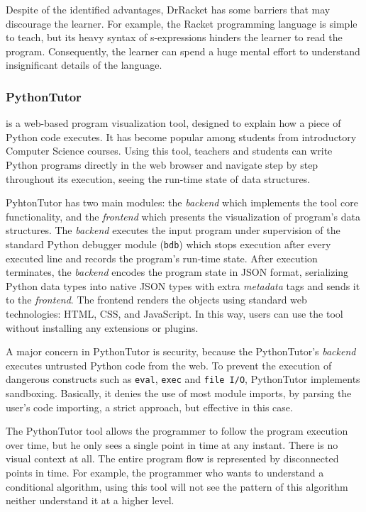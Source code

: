 Despite of the identified advantages, DrRacket has some barriers that may discourage the learner. For example, the Racket programming language is simple to teach, but its heavy syntax of s-expressions hinders the learner to read the program. Consequently, the learner can spend a huge mental effort to understand insignificant details of the language.
\subsubsection{PythonTutor~\cite{GuoSIGCSE2013}} is a web-based program visualization tool, designed to explain how a piece of Python code executes. It has become popular among students from introductory Computer Science courses. Using this tool, teachers and students can write Python programs directly in the web browser and navigate step by step throughout its execution, seeing the run-time state of data structures.

PyhtonTutor has two main modules: the \textit{backend} which implements the tool core functionality, and the \textit{frontend} which presents the visualization of program's data structures. The \textit{backend} executes the input program under supervision of the standard Python debugger module (\texttt{bdb}) which stops execution after every executed line and records the program's run-time state. After execution terminates, the \textit{backend} encodes the program state in JSON format, serializing Python data types into native JSON types with extra \textit{metadata} tags and sends it to the \textit{frontend}. The frontend renders the objects using standard web technologies: HTML, CSS, and JavaScript. In this way, users can use the tool without installing any extensions or plugins.

A major concern in PythonTutor is security, because the PythonTutor's \textit{backend} executes untrusted Python code from the web. To prevent the execution of dangerous constructs such as {\tt eval}, {\tt exec} and {\tt file I/O}, PythonTutor implements sandboxing. Basically, it denies the use of most module imports, by parsing the user's code importing, a strict approach, but effective in this case.

The PythonTutor tool allows the programmer to follow the program execution over time, but he only sees a single point in time at any instant. There is no visual context at all. The entire program flow is represented by disconnected points in time. For example, the programmer who wants to understand a conditional algorithm, using this tool will not see the pattern of this algorithm neither understand it at a higher level.
